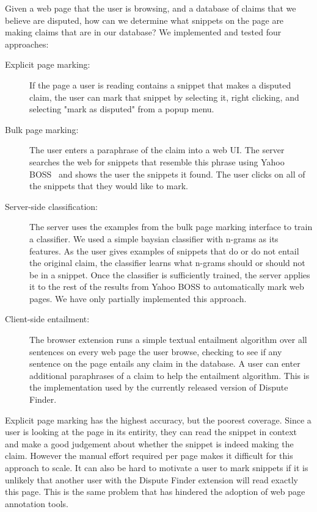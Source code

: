 \documentclass{www2010-submission}
\newcommand{\todo}[1]{}
\begin{document}
Given a web page that the user is browsing, and a database of claims that we believe are disputed, how can we determine what snippets on the page are making claims that are in our database? We implemented and tested four approaches:

\begin{description}
\item[Explicit page marking:] If the page a user is reading contains a snippet that makes a disputed claim, the user can mark that snippet by selecting it, right clicking, and selecting "mark as disputed" from a popup menu.

\item[Bulk page marking:] The user enters a paraphrase of the claim into a web UI. The server searches the web for snippets that resemble this phrase using Yahoo BOSS~\cite{boss?} and shows the user the snippets it found. The user clicks on all of the snippets that they would like to mark.

\item[Server-side classification:] The server uses the examples from the bulk page marking interface to train a classifier. We used a simple baysian classifier with n-grams as its features. As the user gives examples of snippets that do or do not entail the original claim, the classifier learns what n-grams should or should not be in a snippet. Once the classifier is sufficiently trained, the server applies it to the rest of the results from Yahoo BOSS to automatically mark web pages. We have only partially implemented this approach.

\todo{Has anyone done something like this before.}
\todo{We only partially implemented this approach}

\item[Client-side entailment:] The browser extension runs a simple textual entailment algorithm over all sentences on every web page the user browse, checking to see if any sentence on the page entails any claim in the database. A user can enter additional paraphrases of a claim to help the entailment algorithm. This is the implementation used by the currently released version of Dispute Finder.
\end{description}

Explicit page marking has the highest accuracy, but the poorest coverage. Since a user is looking at the page in its entirity, they can read the snippet in context and make a good judgement about whether the snippet is indeed making the claim. However the manual effort required per page makes it difficult for this approach to scale. It can also be hard to motivate a user to mark snippets if it is unlikely that another user with the Dispute Finder extension will read exactly this page. This is the same problem that has hindered the adoption of web page annotation tools.
\end{document}

